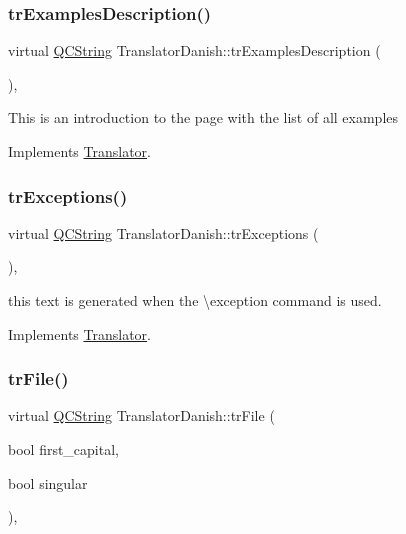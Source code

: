 \subsubsection{\texorpdfstring{trExamplesDescription()}{trExamplesDescription()}}
{\footnotesize\ttfamily virtual \mbox{\hyperlink{class_q_c_string}{Q\+C\+String}} Translator\+Danish\+::tr\+Examples\+Description (\begin{DoxyParamCaption}{ }\end{DoxyParamCaption})\hspace{0.3cm}{\ttfamily [inline]}, {\ttfamily [virtual]}}

This is an introduction to the page with the list of all examples 

Implements \mbox{\hyperlink{class_translator}{Translator}}.

\mbox{\label{class_translator_danish_a0758e2f55138823aa68e7eb0a779452f}} 
\subsubsection{\texorpdfstring{trExceptions()}{trExceptions()}}
{\footnotesize\ttfamily virtual \mbox{\hyperlink{class_q_c_string}{Q\+C\+String}} Translator\+Danish\+::tr\+Exceptions (\begin{DoxyParamCaption}{ }\end{DoxyParamCaption})\hspace{0.3cm}{\ttfamily [inline]}, {\ttfamily [virtual]}}

this text is generated when the \textbackslash{}exception command is used. 

Implements \mbox{\hyperlink{class_translator}{Translator}}.

\mbox{\label{class_translator_danish_a692f575435aa3546ea32a6a98255efda}} 
\subsubsection{\texorpdfstring{trFile()}{trFile()}}
{\footnotesize\ttfamily virtual \mbox{\hyperlink{class_q_c_string}{Q\+C\+String}} Translator\+Danish\+::tr\+File (\begin{DoxyParamCaption}\item[{bool}]{first\+\_\+capital,  }\item[{bool}]{singular }\end{DoxyParamCaption})\hspace{0.3cm}{\ttfamily [inline]}, {\ttfamily [virtual]}}

